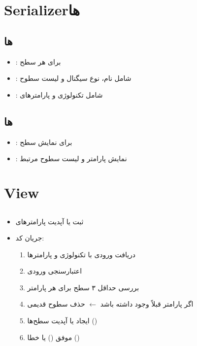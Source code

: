 \documentclass{report}
\begin{document}
\section{Serializerها}
\subsection{ها}
\begin{itemize}
    \item {}: برای هر سطح
    \item {}: شامل نام، نوع سیگنال و لیست سطوح
    \item {}: شامل تکنولوژی و پارامترهای 
\end{itemize}

\subsection{ها}
\begin{itemize}
    \item {}: برای نمایش سطح
    \item {}: نمایش پارامتر و لیست سطوح مرتبط
\end{itemize}

\section{View}
\subsection{}
\begin{itemize}
    \item ثبت یا آپدیت پارامترهای 
    \item جریان کد:
    \begin{enumerate}
        \item دریافت  ورودی با تکنولوژی و پارامترها
        \item اعتبارسنجی ورودی
        \item بررسی حداقل ۳ سطح برای هر پارامتر
        \item اگر پارامتر قبلاً وجود داشته باشد $\leftarrow$ حذف سطوح قدیمی
        \item ایجاد یا آپدیت سطح‌ها ()
        \item {} موفق () یا خطا ()
    \end{enumerate}
\end{itemize}
\end{document}
